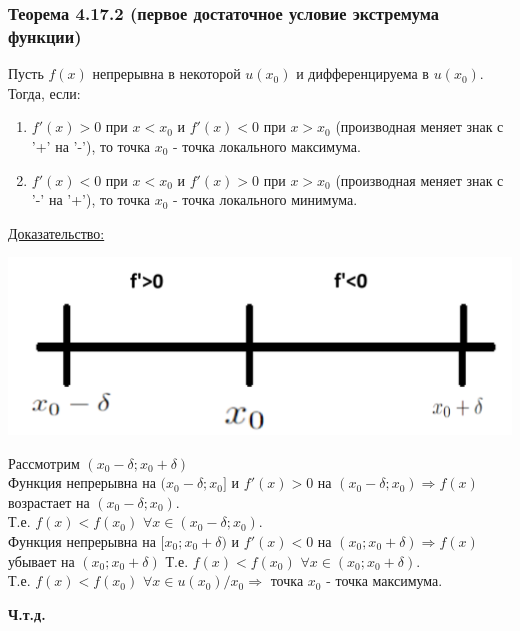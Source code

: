 \documentclass[12pt]{article}
\let\ORIincludegraphics\includegraphics
\renewcommand{\includegraphics}[2][]{\ORIincludegraphics[scale=0.65,#1]{#2}}
\begin{document}
    \subsubsection*{Теорема 4.17.2 (первое достаточное условие экстремума функции)}\label{th:4.17.2}
    Пусть $f(x)$ непрерывна в некоторой $u(x_0)$ и дифференцируема в $u(x_0)$. Тогда, если:
    \begin{enumerate}
        \item $f'(x)>0$ при $x<x_0$ и $f'(x)<0$ при $x>x_0$ (производная меняет знак с '+' на '-'), то точка $x_0$ - точка локального максимума.
        \item $f'(x)<0$ при $x<x_0$ и $f'(x)>0$ при $x>x_0$ (производная меняет знак с '-' на '+'), то точка $x_0$ - точка локального минимума.
    \end{enumerate}
    \par\noindent
    \underline{Доказательство:}
    \begin{adjustwidth}{1.5em}{1.5em}
        \begin{center}
            \includegraphics[scale=0.5]{4.17.1.png}
        \end{center}\noindent
        Рассмотрим $(x_0-\delta;x_0+\delta)$\\
        Функция непрерывна на $(x_0-\delta; x_0]$ и $f'(x)>0$ на $(x_0-\delta;x_0) \Rightarrow f(x)$ возрастает на $(x_0-\delta; x_0)$.\\
        Т.е. $f(x) < f(x_0)$ $\forall x \in (x_0-\delta;x_0)$.\\
        Функция непрерывна на $[x_0;x_0+\delta)$ и $f'(x)<0$ на $(x_0; x_0+\delta) \Rightarrow f(x)$ убывает на $(x_0;x_0+\delta)$ Т.е. $f(x)<f(x_0)$ $\forall x \in (x_0;x_0+\delta)$.\\
        Т.е. $f(x)<f(x_0)$ $\forall x \in u(x_0)/x_0 \Rightarrow$ точка $x_0$ - точка максимума.
        \begin{center}
            \textbf{Ч.т.д.}
        \end{center}
    \end{adjustwidth}
\end{document}
